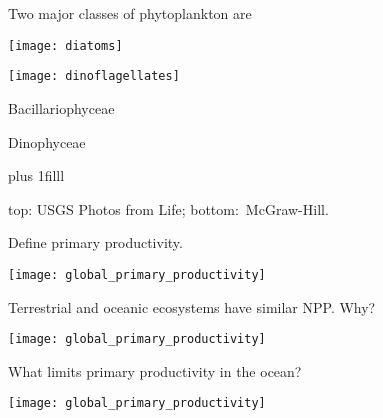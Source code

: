 \documentclass[t]{beamer}
\begin{document}

\begin{frame}[t]{Two major classes of phytoplankton are }
	\vspace*{-\baselineskip}
	
	\begin{multicols}{2}
		{\centering
		\texttt{[image: diatoms]}
		
		\vspace*{0.5\baselineskip}
		
		\texttt{[image: dinoflagellates]}}
		
	\columnbreak
	
		\hangpara{} Bacillariophyceae

		\vspace*{\baselineskip}

		\hangpara{} Dinophyceae
		
	\end{multicols}

\vskip0pt plus 1filll

\tiny top: USGS Photos from Life; bottom: \textcopyright\,McGraw-Hill.
\end{frame}


\begin{frame}[t]{Define primary productivity.}

\begin{center}
	
	\vspace*{0.5\baselineskip}
	
	\texttt{[image: global\_primary\_productivity]}
\end{center}

\end{frame}

\begin{frame}[t]{Terrestrial and oceanic ecosystems have similar NPP. Why?}

	\vspace*{0.5\baselineskip}

	\texttt{[image: global\_primary\_productivity]}

\end{frame}

\begin{frame}[t]{What limits primary productivity in the ocean?}

\begin{center}
	
	\vspace*{0.5\baselineskip}
	
	\texttt{[image: global\_primary\_productivity]}
\end{center}

\end{frame}
\end{document}
